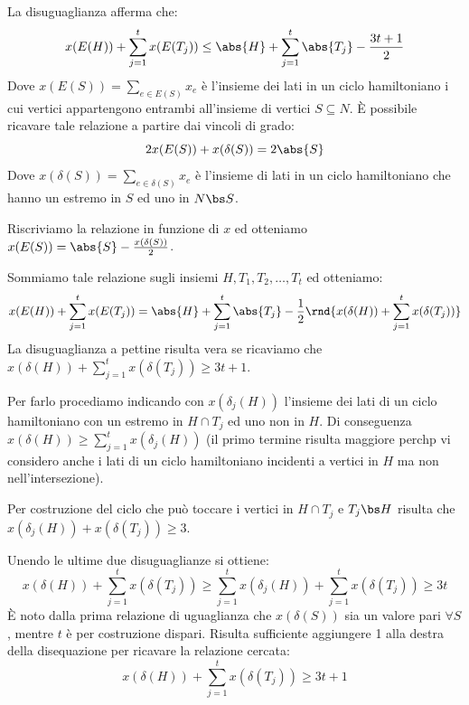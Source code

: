 \documentclass[\main/main.tex]{subfiles}
\begin{document}
La disuguaglianza afferma che:
\[
    x(E(H)) + \sum_{j=1}^t x(E(T_j)) \leq \abs{H} + \sum_{j=1}^t \abs{T_j} - \frac{3t+1}{2}
\]
Dove \(x(E(S)) = \sum_{e \in E(S)} x_e\) è l'insieme dei lati in un ciclo hamiltoniano i cui vertici appartengono entrambi all'insieme di vertici \(S\subseteq N\). È possibile ricavare tale relazione a partire dai vincoli di grado:\[
    2x(E(S)) + x(\delta(S)) = 2\abs{S}
\]Dove \(x(\delta(S)) = \sum_{e \in \delta(S)} x_e\) è l'insieme di lati in un ciclo hamiltoniano che hanno un estremo in \(S\) ed uno in \(N\bs S\).

Riscriviamo la relazione in funzione di \(x\) ed otteniamo \(x(E(S)) = \abs{S} - \frac{x(\delta(S))}{2}\).

Sommiamo tale relazione sugli insiemi \(H, T_1, T_2, \ldots, T_t\) ed otteniamo:
\[
    x(E(H)) + \sum_{j=1}^t x(E(T_j)) = \abs{H} + \sum_{j=1}^t \abs{T_j} - \frac{1}{2}\rnd{x(\delta(H))+\sum_{j=1}^t x(\delta(T_j))}
\]
La disuguaglianza a pettine risulta vera se ricaviamo che \(x(\delta(H)) + \sum_{j=1}^t x(\delta(T_j)) \geq 3t+1\).

Per farlo procediamo indicando con \(x(\delta_j(H))\) l'insieme dei lati di un ciclo hamiltoniano con un estremo in \(H \cap T_j\) ed uno non in \(H\). Di conseguenza \(x(\delta(H)) \geq \sum_{j=1}^t x(\delta_j(H))\) (il primo termine risulta maggiore perchp vi considero anche i lati di un ciclo hamiltoniano incidenti a vertici in \(H\) ma non nell'intersezione).

Per costruzione del ciclo che può toccare i vertici in \(H\cap T_j\) e \(T_j\bs H\) risulta che \(x(\delta_j(H)) + x(\delta(T_j)) \geq 3\).

Unendo le ultime due disuguaglianze si ottiene:
\[
    x(\delta(H)) + \sum_{j=1}^t x(\delta(T_j)) \geq \sum_{j=1}^t x(\delta_j(H)) + \sum_{j=1}^t x(\delta(T_j)) \geq 3t
\]
È noto dalla prima relazione di uguaglianza che \(x(\delta(S))\) sia un valore pari \(\forall S\), mentre \(t\) è per costruzione dispari. Risulta sufficiente aggiungere 1 alla destra della disequazione per ricavare la relazione cercata:
\[
    x(\delta(H)) + \sum_{j=1}^t x(\delta(T_j)) \geq 3t + 1
\]
\end{document}
